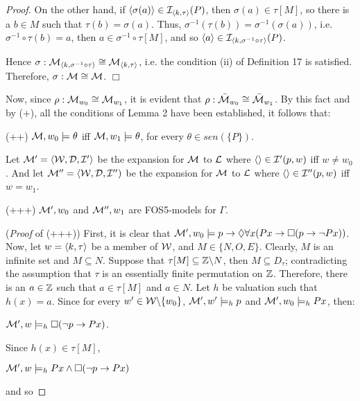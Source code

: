 \begin{proof}
\qquad On the other hand, if $\langle \sigma(a) \rangle \in \mathcal{I}_{\langle k,\tau \rangle}(P)$, then $\sigma(a) \in \tau[M]$, so there is a $b \in M$ such that $\tau(b) = \sigma(a)$. Thus, $\sigma^{-1}(\tau(b)) = \sigma^{-1}(\sigma(a))$, i.e. $\sigma^{-1} \circ \tau(b) =a$, then $a \in \sigma^{-1} \circ \tau[M]$, and so  $\langle a \rangle \in \mathcal{I}_{\langle k,\sigma^{-1} \circ \tau \rangle}(P)$.

\qquad Hence $\sigma: \mathcal{M}_{\langle k,\sigma^{-1} \circ \tau \rangle} \cong \mathcal{M}_{\langle k,\tau \rangle}$, i.e. the condition (ii) of Definition 17 is satisfied.  Therefore, $\sigma: \mathcal{M} \cong \mathcal{M}$. $\Box$

\qquad Now, since $\rho: \mathcal{M}_{w_0} \cong \mathcal{M}_{w_1}$, it is evident that $\rho: \bar{\mathcal{M}}_{w_0} \cong \bar{\mathcal{M}}_{w_1}$. By this fact and by (+), all the conditions of Lemma 2 have been established, it follows that:

\begin{center}
(++) $\mathcal{M},w_{0} \models \theta$ iff $\mathcal{M},w_{1} \models \theta$, for every $\theta \in sen(\{P\})$.
\end{center}

\qquad Let $\mathcal{M}^{\prime} = \langle \mathcal{W},\mathcal{D},\mathcal{I}^{\prime} \rangle$ be the expansion for $\mathcal{M}$ to $\mathcal{L}$ where $\langle \rangle \in \mathcal{I}^{\prime}(p,w)$ iff $w \neq w_{0}$. And let $\mathcal{M}^{\prime\prime} = \langle \mathcal{W},\mathcal{D},\mathcal{I}^{\prime\prime})$ be the expansion for $\mathcal{M}$ to $\mathcal{L}$ where $ \langle \rangle \in \mathcal{I}^{\prime\prime}(p,w)$ iff $w = w_{1}$. 

\begin{center}
(+++) $\mathcal{M}^{\prime},w_{0}$ and $\mathcal{M}^{\prime\prime},w_{1}$ are FOS5-models for $\Gamma$.
\end{center}


\qquad (\textit{Proof} of (+++)) First, it is clear that $\mathcal{M}^{\prime},w_{0} \models p \rightarrow \Diamond\forall x (Px \rightarrow \Box (p \rightarrow \neg Px))$. Now, let $w = \langle k,\tau \rangle$ be a member of $\mathcal{W}$, and $M \in \{N,O,E\}$. Clearly, $M$ is an infinite set and $M \subseteq N$. Suppose that $\tau[M] \subseteq \mathbb{Z}\backslash N$, then $M \subseteq D_{\tau}$; contradicting the assumption that $\tau$ is an essentially finite permutation on $\mathbb{Z}$. Therefore, there is an $a \in \mathbb{Z}$ such that $a \in \tau[M]$ and $a \in N$. Let $h$ be valuation such that $h(x)=a$.  Since for every $w^{\prime} \in \mathcal{W} \backslash \{w_0\}$, $\mathcal{M}^{\prime},w^{\prime}\models_{h} p$ and $\mathcal{M}^{\prime},w_{0}\models_{h} Px$, then:

\begin{center}
$\mathcal{M}^{\prime},w \models_{h} \Box(\neg p \rightarrow Px)$.
\end{center}

\qquad Since $h(x) \in \tau[M]$, 
\begin{center}
$\mathcal{M}^{\prime},w\models_{h} Px \wedge \Box(\neg p \rightarrow Px)$
\end{center}
and so


\end{proof}
